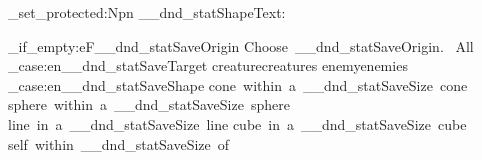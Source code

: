 \cs_set_protected:Npn \__dnd_statShapeText:
{

	\tl_if_empty:eF{\__dnd_statSaveOrigin}
	{
		Choose\ \__dnd_statSaveOrigin.\
	}
	All~
	\str_case:en{\__dnd_statSaveTarget}
	{
		{creature}{creatures}
			{enemy}{enemies}
	}
	\str_case:en{\__dnd_statSaveShape}
	{
		{cone}{\ within\ a\ \__dnd_statSaveSize\ cone}
			{sphere}{\ within\ a\ \__dnd_statSaveSize\ sphere}
			{line}{\ in\ a\ \__dnd_statSaveSize\ line}
			{cube}{\ in\ a\ \__dnd_statSaveSize\ cube}
			{self}{\ within\ \__dnd_statSaveSize\ of\ \RpgStatName*{}}
	}
}


\ExplSyntaxOff
\def\dndSaveStringMustMake{\ must make a}
\def\dndSaveStringWithin{ within a}
